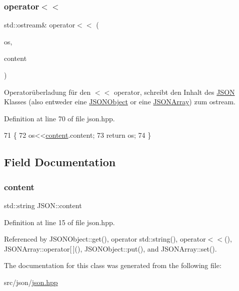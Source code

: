 \subsubsection{\texorpdfstring{operator$<$$<$}{operator<<}}
{\footnotesize\ttfamily std\+::ostream\& operator$<$$<$ (\begin{DoxyParamCaption}\item[{std\+::ostream \&}]{os,  }\item[{\mbox{\hyperlink{class_j_s_o_n}{J\+S\+ON}} \&}]{content }\end{DoxyParamCaption})\hspace{0.3cm}{\ttfamily [friend]}}

Operatorüberladung für den $<$$<$ operator, schreibt den Inhalt des \mbox{\hyperlink{class_j_s_o_n}{J\+S\+ON}} Klasses (also entweder eine \mbox{\hyperlink{class_j_s_o_n_object}{J\+S\+O\+N\+Object}} or eine \mbox{\hyperlink{class_j_s_o_n_array}{J\+S\+O\+N\+Array}}) zum ostream. 

Definition at line 70 of file json.\+hpp.


\begin{DoxyCode}
71 \{
72     os<<\mbox{\hyperlink{class_j_s_o_n_ad1ace77234b963a2994178ce7f76a181}{content}}.content;
73     \textcolor{keywordflow}{return} os;
74 \}
\end{DoxyCode}


\subsection{Field Documentation}
\mbox{\label{class_j_s_o_n_ad1ace77234b963a2994178ce7f76a181}} 
\subsubsection{\texorpdfstring{content}{content}}
{\footnotesize\ttfamily std\+::string J\+S\+O\+N\+::content\hspace{0.3cm}{\ttfamily [protected]}}



Definition at line 15 of file json.\+hpp.



Referenced by J\+S\+O\+N\+Object\+::get(), operator std\+::string(), operator$<$$<$(), J\+S\+O\+N\+Array\+::operator\mbox{[}$\,$\mbox{]}(), J\+S\+O\+N\+Object\+::put(), and J\+S\+O\+N\+Array\+::set().



The documentation for this class was generated from the following file\+:\begin{DoxyCompactItemize}
\item 
src/json/\mbox{\hyperlink{src_2json_2json_8hpp}{json.\+hpp}}\end{DoxyCompactItemize}

